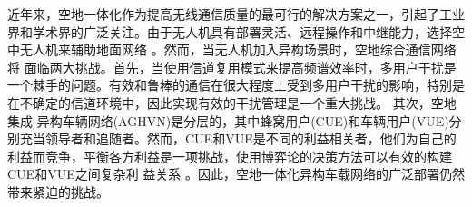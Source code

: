 近年来，空地一体化作为提高无线通信质量的最可行的解决方案之一，引起了工业界和学术界的广泛关注。由于无人机具有部署灵活、远程操作和中继能力，选择空中无人机来辅助地面网络 \supercite{ACO}。然而，当无人机加入异构场景时，空地综合通信网络将
面临两大挑战。首先，当使用信道复用模式来提高频谱效率时，多用户干扰是一个棘手的问题。有效和鲁棒的通信在很大程度上受到多用户干扰的影响，特别是在不确定的信道环境中，因此实现有效的干扰管理是一个重大挑战\supercite{CCO}。 其次，空地集成
异构车辆网络(AGHVN)是分层的，其中蜂窝用户(CUE)和车辆用户(VUE)分别充当领导者和追随者。然而，CUE和VUE是不同的利益相关者，他们为自己的利益而竞争，平衡各方利益是一项挑战，使用博弈论的决策方法可以有效的构建CUE和VUE之间复杂利
益关系 \supercite{胡益恺智能车辆决策方法研究综述}。因此，空地一体化异构车载网络的广泛部署仍然带来紧迫的挑战。

